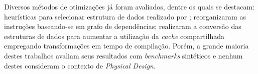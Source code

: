 \begin{table}[hb]
\centering
\caption{Resumo dos trabalhos correlatos.}
\label{tab:resumo_trabalhos_correlatos}
\end{table}

Diversos métodos de otimizações já foram avaliados, dentre os quais se destacam:
heurísticas para selecionar estrutura de dados realizado por ;
 reorganizaram as instruções baseando-se em grafo de dependências;
 realizaram a conversão das estruturas de dados para aumentar a utilização da \textit{cache} compartilhada empregando transformações em tempo de compilação.
Porém, a grande maioria destes trabalhos avaliam seus resultados com \textit{benchmarks} sintéticos e nenhum destes consideram o contexto de \textit{Physical Design}.

